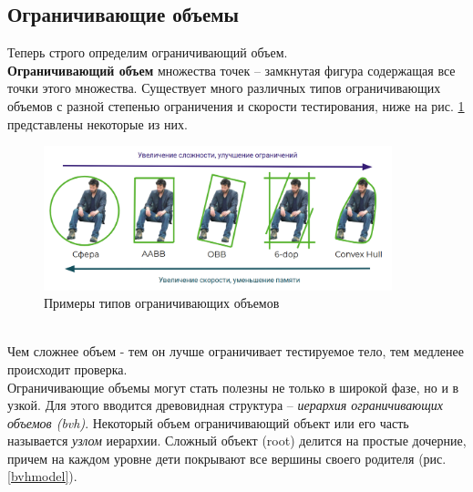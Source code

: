\documentclass[11pt,a4paper]{extarticle}
\begin{document}
	\subsection{Ограничивающие объемы}
		Теперь строго определим ограничивающий объем.\\
		\textbf{Ограничивающий объем} множества точек -- замкнутая фигура содержащая все точки этого множества.
		Существует много различных типов ограничивающих объемов с разной степенью ограничения и скорости тестирования, ниже на рис. \ref{bv_kianu} представлены некоторые из них.
		\begin{figure}[ht]
			\centering
			\includegraphics[width=0.9\textwidth]{bv_kianu}
			\caption{Примеры типов ограничивающих объемов}
			\label{bv_kianu}
		\end{figure}\\
		Чем сложнее объем - тем он лучше ограничивает тестируемое тело, тем медленее происходит проверка. \\
		Ограничивающие объемы могут стать полезны не только в широкой фазе, но и в узкой.
		Для этого вводится древовидная структура -- \emph{иерархия ограничивающих объемов (bvh)}.
		Некоторый объем ограничивающий объект или его часть называется \emph{узлом} иерархии.
		Сложный объект (root) делится на простые дочерние, причем на каждом уровне дети покрывают все вершины своего родителя
		(рис.\,\ref{bvhmodel}).
\end{document}
